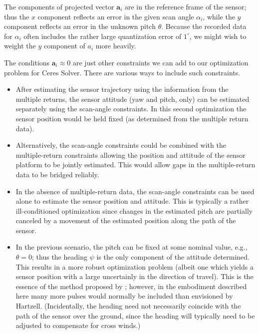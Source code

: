 \documentclass
[rmp,reprint,
twocolumn,amsmath,showkeys,letterpaper,raggedbottom]{revtex4-2}
\begin{document}
The components of projected vector $\mathbf a_i$ are in the reference
frame of the sensor; thus the $x$ component reflects an error in the
given scan angle $\alpha_i$, while the $y$ component reflects an error
in the unknown pitch $\theta$.  Because the recorded data for $\alpha_i$
often includes the rather large quantization error of $1^\circ$, we
might wish to weight the $y$ component of $a_i$ more heavily.

The conditions $\mathbf a_i \approx 0$ are just other constraints we can
add to our optimization problem for Ceres Solver.  There are various
ways to include such constraints.
\begin{itemize}
  \item After estimating the sensor trajectory using the information
    from the multiple returns, the sensor attitude (yaw and pitch, only)
    can be estimated separately using the scan-angle constraints.  In
    this second optimization the sensor position would be held fixed (as
    determined from the multiple return data).
  \item Alternatively, the scan-angle constraints could be combined with
    the multiple-return constraints allowing the position and attitude
    of the sensor platform to be jointly estimated.  This would allow
    gaps in the multiple-return data to be bridged reliably.
  \item In the absence of multiple-return data, the scan-angle
    constraints can be used alone to estimate the sensor position and
    attitude.  This is typically a rather ill-conditioned optimization
    since changes in the estimated pitch are partially canceled by a
    movement of the estimated position along the path of the sensor.
  \item In the previous scenario, the pitch can be fixed at some nominal
    value, e.g., $\theta = 0$; thus the heading $\psi$ is the only
    component of the attitude determined.  This results in a more robust
    optimization problem (albeit one which yields a sensor position with
    a large uncertainly in the direction of travel).  This is the
    essence of the method proposed by \citet{hartzell20}; however, in
    the embodiment described here many more pulses would normally be
    included than envisioned by Hartzell.  (Incidentally, the heading
    need not necessarily coincide with the path of the sensor over the
    ground, since the heading will typically need to be adjusted to
    compensate for cross winds.)
\end{itemize}
\end{document}
